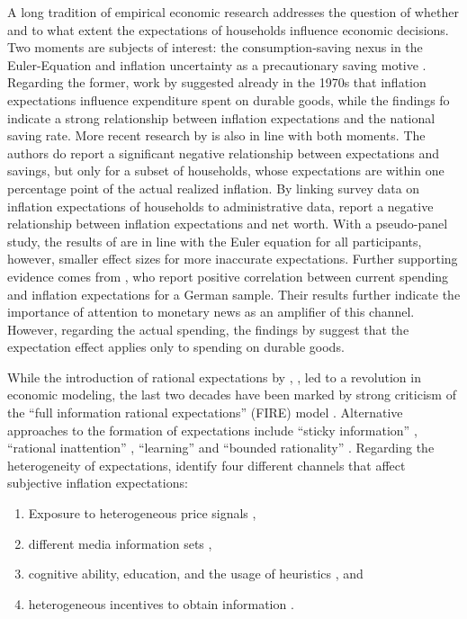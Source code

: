 A long tradition of empirical economic research addresses the question of whether and to what extent the expectations of households influence economic decisions. Two moments are subjects of interest: the consumption-saving nexus in the Euler-Equation and inflation uncertainty as a precautionary saving motive \citep{DAcunto.2023}. Regarding the former, work by \cite{Juster.1972} suggested already in the 1970s that inflation expectations influence expenditure spent on durable goods, while the findings fo \cite{Burch.1975} indicate a strong relationship between inflation expectations and the national saving rate. More recent research by \cite{Bachmann.2015} is also in line with both moments. The authors do report a significant negative relationship between expectations and savings, but only for a subset of households, whose expectations are within one percentage point of the actual realized inflation. By linking survey data on inflation expectations of households to administrative data, \cite{Vellekoop.2019} report a negative relationship between inflation expectations and net worth. With a pseudo-panel study, the results of \cite{Duca.2021} are in line with the Euler equation for all participants, however, smaller effect sizes for more inaccurate expectations. Further supporting evidence comes from \cite{Draeger.2021}, who report positive correlation between current spending and inflation expectations for a German sample. Their results further indicate the importance of attention to monetary news as an amplifier of this channel. However, regarding the actual spending, the findings by \cite{Burke.2023} suggest that the expectation effect applies only to spending on durable goods. 

While the introduction of rational expectations by \cite{Muth.1961}, \cite{Lucas.1972}, \cite{Lucas.1979} led to a revolution in economic modeling, the last two decades have been marked by strong criticism of the ``full information rational expectations'' (FIRE) model \citep{Coibion.Gorodnichenko.2012}. Alternative approaches to the formation of expectations include ``sticky information'' \citep{Mankiw.2002,Carroll.2003,Carroll.2005, doepke.etal.2008a, doepke.etal.2008b}, ``rational inattention'' \citep{Woodford.2001, Sims.2003}, ``learning'' \citep{Evans.Honkapohja.2001} and ``bounded rationality'' \citep{Gabaix.2014, Fuster.2010, Evans.Honkapohja.2001}. Regarding the heterogeneity of expectations, \cite{Weber.etal.2022} identify four different channels that affect subjective inflation expectations: 
\begin{enumerate}
	\item Exposure to heterogeneous price signals \citep{Acunto.2021},
	\item different media information sets \citep{Carroll.2003,Carroll.2005, doepke.etal.2008a,Bachmann.2021,DAcunto.2022a,Draeger2016},
	\item cognitive ability, education, and the usage of heuristics \citep{DAcunto.2019a, DAcunto.2022b, Gennaioli.2010}, and
	\item heterogeneous incentives to obtain information \citep{Cavallo.2017}.
\end{enumerate}

